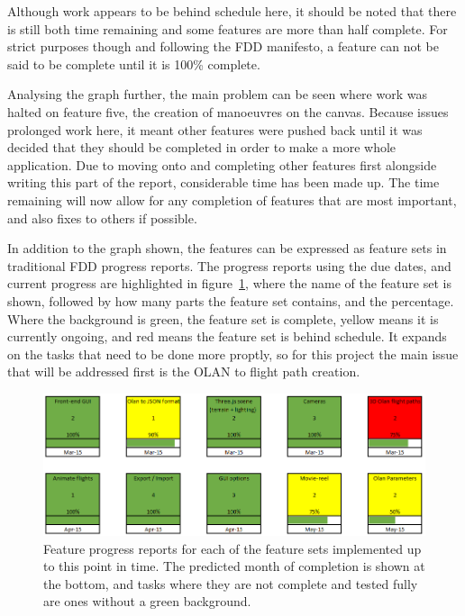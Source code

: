 Although work appears to be behind schedule here, it should be noted that there is still both time remaining and some features are more than half complete. For strict purposes though and following the FDD manifesto, a feature can not be said to be complete until it is 100\% complete. 

Analysing the graph further, the main problem can be seen where work was halted on feature five, the creation of manoeuvres on the canvas. Because issues prolonged work here, it meant other features were pushed back until it was decided that they should be completed in order to make a more whole application. Due to moving onto and completing other features first alongside writing this part of the report, considerable time has been made up. The time remaining will now allow for any completion of features that are most important, and also fixes to others if possible. 

In addition to the graph shown, the features can be expressed as feature sets in traditional FDD progress reports. The progress reports using the due dates, and current progress are highlighted in figure~\ref{fig:featureprogress}, where the name of the feature set is shown, followed by how many parts the feature set contains, and the percentage. Where the background is green, the feature set is complete, yellow means it is currently ongoing, and red means the feature set is behind schedule. It expands on the tasks that need to be done more proptly, so for this project the main issue that will be addressed first is the OLAN to flight path creation.

\begin{figure}[h]
  \centering
      \includegraphics[width=1\textwidth]{images/featureProgress.png}
  \caption{Feature progress reports for each of the feature sets implemented up to this point in time. The predicted month of completion is shown at the bottom, and tasks where they are not complete and tested fully are ones without a green background.}
  \label{fig:featureprogress}
\end{figure}

